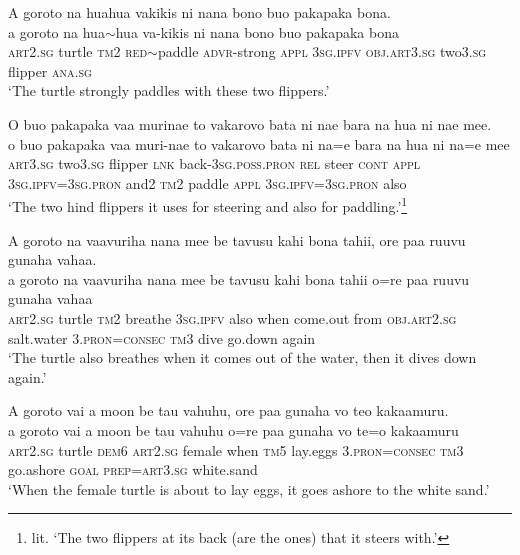 \newpage
\ea\label{ex:text19-7}
A goroto na huahua vakikis ni nana bono buo pakapaka bona.\\
\gll a	goroto	na	hua{$\sim$}hua	va-kikis	ni	nana	bono	buo	pakapaka	bona\\
     \textsc{art}2.\textsc{sg}	turtle	\textsc{tm}2	\textsc{red}{$\sim$}paddle	\textsc{advr}-strong	\textsc{appl}	3\textsc{sg}.\textsc{ipfv}	\textsc{obj}.\textsc{art}3.\textsc{sg}	two3.\textsc{sg}	flipper	\textsc{ana}.\textsc{sg}\\
\glt `The turtle strongly paddles with these two flippers.'
\z

\ea\label{ex:text19-8}
O buo pakapaka vaa murinae to vakarovo bata ni nae bara na hua ni nae mee.\\
\gll o	buo	pakapaka	vaa	muri-nae	to	vakarovo	bata	ni	na=e	bara	na	hua	ni	na=e	mee\\
     \textsc{art}3.\textsc{sg}	two3.\textsc{sg}	flipper	\textsc{lnk}	back-3\textsc{sg}.\textsc{poss}.\textsc{pron}	\textsc{rel}	steer	\textsc{cont}	\textsc{appl}	3\textsc{sg}.\textsc{ipfv}=3\textsc{sg}.\textsc{pron}	and2	\textsc{tm}2	paddle	\textsc{appl}	3\textsc{sg}.\textsc{ipfv}=3\textsc{sg}.\textsc{pron}	also\\
\glt `The two hind flippers it uses for steering and also for paddling.'\footnote{lit. `The two flippers at its back (are the ones) that it steers with.'}
\z

\ea\label{ex:text19-9}
A goroto na vaavuriha nana mee be tavusu kahi bona tahii, ore paa ruuvu gunaha vahaa.\\
\gll a	goroto	na	vaavuriha	nana	mee	be	tavusu	kahi	bona	tahii	o=re	paa	ruuvu	gunaha	vahaa\\
     \textsc{art}2.\textsc{sg}	turtle	\textsc{tm}2	breathe	3\textsc{sg}.\textsc{ipfv}	also	when	come.out	from	\textsc{obj}.\textsc{art}2.\textsc{sg}	salt.water	3.\textsc{pron}=\textsc{consec}	\textsc{tm}3	dive	go.down	again\\
\glt `The turtle also breathes when it comes out of the water, then it dives down again.'
\z

\ea\label{ex:text19-10}
A goroto vai a moon be tau vahuhu, ore paa gunaha vo teo kakaamuru.\\
\gll a	goroto	vai	a	moon	be	tau	vahuhu	o=re	paa	gunaha	vo	te=o	kakaamuru\\
     \textsc{art}2.\textsc{sg}	turtle	\textsc{dem}6	\textsc{art}2.\textsc{sg}	female	when	\textsc{tm}5	lay.eggs	3.\textsc{pron}=\textsc{consec}	\textsc{tm}3	go.ashore	\textsc{goal}	\textsc{prep}=\textsc{art}3.\textsc{sg}	white.sand\\
\glt `When the female turtle is about to lay eggs, it goes ashore to the white sand.'
\z

